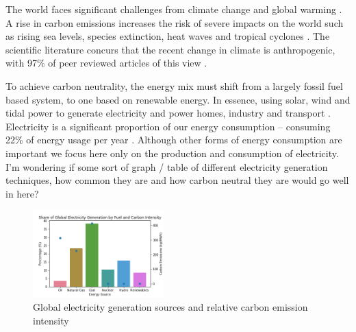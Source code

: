 
The world faces significant challenges from climate change and global warming \cite{Masson-Delmotte2018}. A rise in carbon emissions increases the risk of severe impacts on the world such as rising sea levels, species extinction, heat waves and tropical cyclones \cite{IPCC2014}. The scientific literature concurs that the recent change in climate is anthropogenic, with 97\% of peer reviewed articles of this view \cite{Cook2013}.  

To achieve carbon neutrality, the energy mix must shift from a largely fossil fuel based system, to one based on renewable energy. In essence, using solar, wind and tidal power to generate electricity and power homes, industry and transport \cite{Hoffert2002}. Electricity is a significant proportion of our energy consumption -- consuming 22\% of energy usage per year \cite{Lakshmi2017}. Although other forms of energy consumption are important we focus here only on the production and consumption of electricity. {\color{red}I'm wondering if some sort of graph / table of different electricity generation techniques, how common they are and how carbon neutral they are would go well in here?}


\begin{figure}[h]
	\begin{center}
		\includegraphics[width=0.45\textwidth]{figures/elec_gen_carbon.png}
		\caption{Global electricity generation sources and relative carbon emission intensity ~\cite{BP2018,Hall1983}}
		\label{fig:fuel_emissions_market_share}
	\end{center}
\end{figure}


